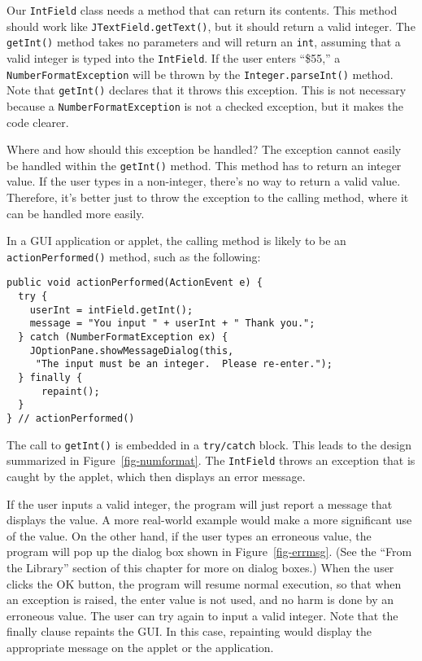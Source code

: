 Our {\tt IntField} class needs a method that can return its
contents.  This method should work like {\tt JTextField.getText()}, but
it should return a valid integer.  The {\tt getInt()} method takes no
parameters and will return an {\tt int}, assuming that a valid integer
is typed into the {\tt IntField}.  If the user enters ``\$55,'' a
{\tt NumberFormatException} will be thrown by the {\tt Integer.parseInt()}
method.  Note that {\tt getInt()} declares that it throws this
exception.  This is not necessary because a {\tt NumberFormatException}
is not a checked exception, but it makes the code clearer.

Where and how should this exception be handled? The exception cannot
easily be handled within the {\tt getInt()} method.  This method has to
return an integer value.  If the user types in a non-integer, there's
no way to return a valid value.  Therefore, it's better just to throw
the exception to the calling method, where it can be handled more
easily.


In a GUI application or applet, the calling method is likely to be
an {\tt actionPerformed()} method, such as the following:

\begin{jjjlisting}
\begin{lstlisting}
public void actionPerformed(ActionEvent e) {
  try {
    userInt = intField.getInt();
    message = "You input " + userInt + " Thank you.";
  } catch (NumberFormatException ex) {
    JOptionPane.showMessageDialog(this,
     "The input must be an integer.  Please re-enter.");
  } finally {
      repaint();
  }
} // actionPerformed()
\end{lstlisting}
\end{jjjlisting}

\noindent The call to {\tt getInt()} is embedded in a {\tt try/catch}
block.  This leads to the design summarized in 
Figure~\ref{fig-numformat}.  The {\tt IntField} throws an exception that
is caught by the applet, which then displays an error message.

\begin{figure}[h]
\end{figure}

If the user inputs a valid integer, the program will just report a
message that displays the value.  A more real-world example would make
a more significant use of the value.  On the other hand, if the user
types an erroneous value, the program will pop up the dialog box shown
in Figure~\ref{fig-errmsg}. (See the ``From the Library'' section of
this chapter for more on dialog boxes.) When the user clicks the OK
button, the program will resume normal execution, so that when an
exception is raised, the enter value is not used, and no harm is done
by an erroneous value.  The user can try again to input a valid
integer.  Note that the finally clause repaints the GUI.  In this
case, repainting would display the appropriate message on the applet
or the application.

